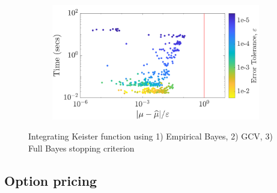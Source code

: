 \documentclass[handout, 10pt,compress,xcolor={usenames,dvipsnames}]{beamer} %
\begin{document}
{\begin{figure}[htp]
\begin{subfigure}[b]{0.43\textwidth}
    \includegraphics[width=\textwidth]{"../figures/Lattice/Lattice_Keister_guaranteed_time_full_C1sin_d4_r2_2019-Jun-27"}
    \end{subfigure}
   \caption{Integrating Keister function using 1) Empirical Bayes, 2) GCV, 3) Full Bayes stopping criterion}
\end{figure}
}



\subsection{Option pricing}
\end{document}
